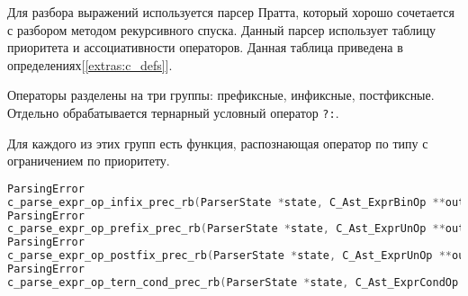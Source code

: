


Для разбора выражений используется парсер Пратта, который хорошо сочетается с разбором методом рекурсивного спуска.
Данный парсер использует таблицу приоритета и ассоциативности операторов. Данная таблица приведена в определениях[\ref{extras:c_defs}].

Операторы разделены на три группы: префиксные, инфиксные, постфиксные.
Отдельно обрабатывается тернарный условный оператор \verb|?:|.

Для каждого из этих групп есть функция, распознающая оператор по типу с ограничением по приоритету.

\begin{lstlisting}[language=c, caption={Функции разбора операторов}, label={parsing:expr:parse-op-headers}]
ParsingError
c_parse_expr_op_infix_prec_rb(ParserState *state, C_Ast_ExprBinOp **out_binop, u8_t max_precedence, bool is_strict_precedence);
ParsingError
c_parse_expr_op_prefix_prec_rb(ParserState *state, C_Ast_ExprUnOp **out_unop, u8_t max_precedence, bool is_strict_precedence);
ParsingError
c_parse_expr_op_postfix_prec_rb(ParserState *state, C_Ast_ExprUnOp **out_unop, u8_t max_precedence);
ParsingError
c_parse_expr_op_tern_cond_prec_rb(ParserState *state, C_Ast_ExprCondOp **out_tern, u8_t max_precedence, bool is_strict_precedence);
\end{lstlisting}

